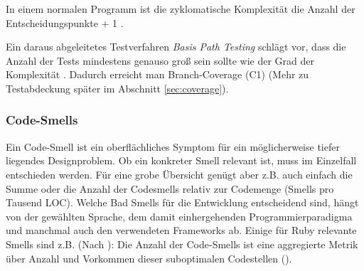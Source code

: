 
In einem normalen Programm ist die zyklomatische Komplexität die Anzahl der Entscheidungspunkte + 1 \citep[S. 314]{mccabe_complexity_1976}.

Ein daraus abgeleitetes Testverfahren \textit{Basis Path Testing} schlägt vor, dass die Anzahl der Tests mindestens genauso groß sein sollte wie der Grad der Komplexität \citep[S. 318]{mccabe_complexity_1976}. Dadurch erreicht man Branch-Coverage (C1) (Mehr zu Testabdeckung später im Abschnitt \ref{sec:coverage}).

\subsubsection{Code-Smells}

  Ein Code-Smell ist ein oberflächliches Symptom für ein möglicherweise tiefer liegendes Designproblem. Ob ein konkreter Smell relevant ist, muss im Einzelfall entschieden werden. Für eine grobe Übersicht genügt aber z.B. auch einfach die Summe oder die Anzahl der Codesmells relativ zur Codemenge (Smells pro Tausend LOC). Welche Bad Smells für die Entwicklung entscheidend sind, hängt von der gewählten Sprache, dem damit einhergehenden Programmierparadigma und manchmal auch den verwendeten Frameworks ab. Einige für Ruby relevante Smells sind z.B. (Nach \citep{kevin_rutherford_code_2010}):
    Die Anzahl der Code-Smells ist eine aggregierte Metrik über Anzahl und Vorkommen dieser suboptimalen Codestellen ().

